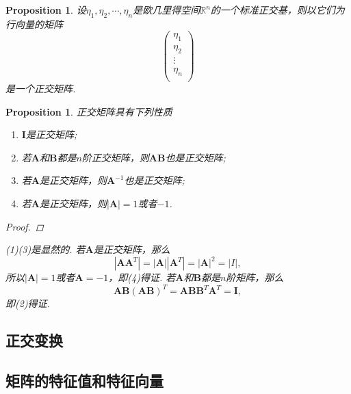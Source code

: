 \documentclass{article}
\newtheorem{proposition}[theorem]{Proposition}
\newcommand{\mbf}[1]{\bm{#1}}
\begin{document}
\begin{proposition}\label{orthogonal-matrix: basis}
\rm 设$\eta_1,\eta_2,\cdots,\eta_n$是欧几里得空间$\mathbb{R}^n$的一个标准正交基，则以它们为行向量的矩阵
$$
\begin{pmatrix}
\eta_1 \\
\eta_2 \\
\vdots \\
\eta_n \\
\end{pmatrix}
$$
是一个正交矩阵.
\end{proposition}

\begin{proposition}
\rm 正交矩阵具有下列性质
\begin{enumerate}
	\item $\mbf{I}$是正交矩阵;
	\item 若$\mbf{A}$和$\mbf{B}$都是$n$阶正交矩阵，则$\mbf{A}\mbf{B}$也是正交矩阵;
	\item 若$\mbf{A}$是正交矩阵，则$\mbf{A}^{-1}$也是正交矩阵;
	\item 若$\mbf{A}$是正交矩阵，则$|\mbf{A}| = 1$或者$-1$.
\end{enumerate}
	
\begin{proof}

\end{proof}
(1)(3)是显然的. 若$\mbf{A}$是正交矩阵，那么
$$
|\mbf{A}\mbf{A}^T| =|\mbf{A}||\mbf{A}^T| = |\mbf{A}|^2 = |I|,
$$
所以$|\mbf{A}|=1$或者$\mbf{A}=-1$，即(4)得证. 若$\mbf{A}$和$\mbf{B}$都是$n$阶矩阵，那么
$$
\mbf{A}\mbf{B}(\mbf{A}\mbf{B})^T = \mbf{A}\mbf{B}\mbf{B}^T\mbf{A}^T = \mbf{I},
$$
即(2)得证. 
\end{proposition}

\subsection{正交变换}

\subsection{矩阵的特征值和特征向量}
\end{document}
